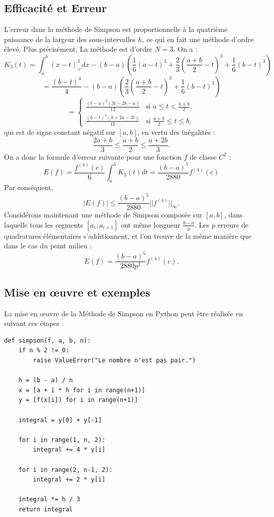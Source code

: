 \documentclass[12pt,a4paper]{article}
\begin{document}
\subsection{Efficacité et Erreur}
L'erreur dans la méthode de Simpson est proportionnelle à la quatrième puissance de la largeur des sous-intervalles $h$, ce qui en fait une méthode d'ordre élevé. Plus précisément, La méthode est d'ordre $N = 3$. On a :
\[
K_3(t) = \int_{a}^{b} (x - t)^3_+ dx - (b-a) \left( \frac{1}{6} (a - t)^3 + \frac{2}{3} \left( \frac{a+b}{2} - t \right)^3 + \frac{1}{6} (b - t)^3 \right)
\]
\[
= \frac{(b - t)^4}{4} - \left( b - a \right) \left( \frac{2}{3} (\frac{a + b}{2} - t)^3 + \frac{1}{6} (b - t)^3\right)
\]
\[
= \begin{cases}
\frac{(t - a)^3(3t - 2b - a)}{12} & \text{si } a \leq t < \frac{a + b}{2}, \\
\frac{(b - t)^3(b + 2a - 3t)}{12} & \text{si } \frac{a + b}{2} \leq t \leq b,
\end{cases}
\]
qui est de signe constant négatif sur $[a, b]$, en vertu des inégalités :
\[
\frac{2a + b}{3} \leq \frac{a + b}{2} \leq \frac{a + 2b}{3}.
\]
On a donc la formule d'erreur suivante pour une fonction $f$ de classe $C^2$ :
\[
E(f) = \frac{f^{(4)}(c)}{6} \int_{a}^{b} K_3(t) dt = \frac{(b - a)^5}{2880} f^{(4)}(c)
\]
Par conséquent,
\[
|E(f)| \leq \frac{(b - a)^5}{2880} ||f^{(4)}||_{\infty}.
\]
Considérons maintenant une méthode de Simpson composée sur $[a, b]$, dans laquelle tous les segments $[a_i, a_{i+1}]$ ont même longueur $\frac{b - a}{p}$. Les $p$ erreurs de quadratures élémentaires s'additionnent, et l'on trouve de la même manière que dans le cas du point milieu :
\[
E(f) = \frac{(b - a)^5}{2880p^2} f^{(4)}(c).
\]


\subsection{Mise en œuvre et exemples}

La mise en œuvre de la Méthode de Simpson en Python peut être réalisée en suivant ces étapes :

\begin{lstlisting}
def simpson(f, a, b, n):
    if n % 2 != 0:
        raise ValueError("Le nombre n'est pas pair.")
    
    h = (b - a) / n
    x = [a + i * h for i in range(n+1)]
    y = [f(x[i]) for i in range(n+1)]
    
    integral = y[0] + y[-1] 
    
    for i in range(1, n, 2):
        integral += 4 * y[i]
    
    for i in range(2, n-1, 2):
        integral += 2 * y[i]
    
    integral *= h / 3
    return integral
\end{lstlisting}
\newpage
\end{document}
